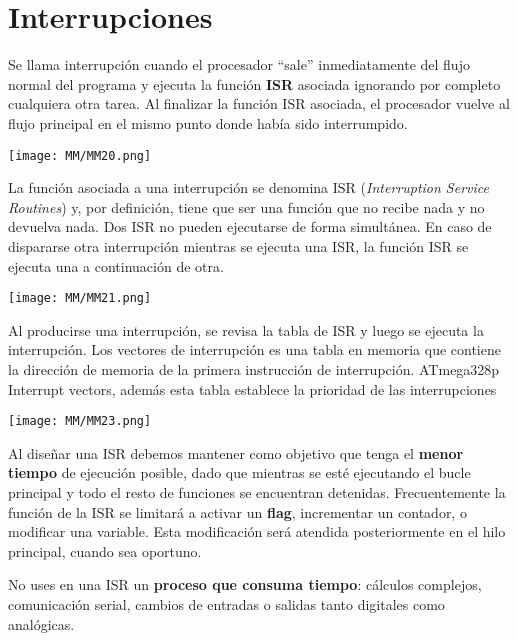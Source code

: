 \documentclass[
	12pt, %
	fleqn, %
	a4paper, %
	oneside, %
]{LegrandOrangeBook}
\begin{document}
\section{Interrupciones}
\begin{definition}[Interrupción]
Se llama interrupción cuando el procesador ``sale'' inmediatamente del flujo normal del programa y ejecuta la función \textbf{ISR} asociada ignorando por completo cualquiera otra tarea. Al finalizar la función ISR asociada, el procesador vuelve al flujo principal en el mismo punto donde había sido interrumpido.
\begin{center}
\texttt{[image: MM/MM20.png]}
\end{center}
\end{definition}
\begin{definition}[ISR]
La función asociada a una interrupción se denomina ISR (\textit{Interruption Service Routines}) y, por definición, tiene que ser una función que no recibe nada y no devuelva nada. Dos ISR no pueden ejecutarse de forma simultánea. En caso de dispararse otra interrupción mientras se ejecuta una ISR, la función ISR se ejecuta una a continuación de otra.
\begin{center}
\texttt{[image: MM/MM21.png]}
\end{center}
Al producirse una interrupción, se revisa la tabla de ISR y luego se ejecuta la interrupción. Los vectores de interrupción es una tabla en memoria que contiene la dirección de memoria de la primera instrucción de interrupción. ATmega328p Interrupt vectors, además esta tabla establece la prioridad de las interrupciones
\begin{center}
\texttt{[image: MM/MM23.png]}
\end{center}
\end{definition}
Al diseñar una ISR debemos mantener como objetivo que tenga el \textbf{menor tiempo} de ejecución posible, dado que mientras se esté ejecutando el bucle principal y todo el resto de funciones se encuentran
detenidas. Frecuentemente la función de la ISR se limitará a activar un \textbf{flag}, incrementar un contador, o modificar una variable. Esta modificación será atendida posteriormente en el hilo principal, cuando sea oportuno.
\begin{remark}
No uses en una ISR un \textbf{proceso que consuma tiempo}: cálculos complejos, comunicación serial, cambios de entradas o salidas tanto digitales como analógicas.
\end{remark}
\end{document}
